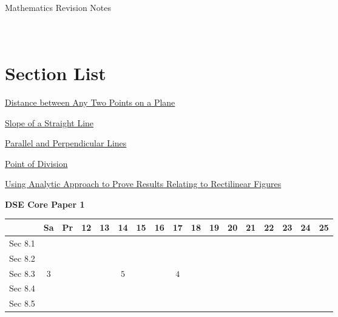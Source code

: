 \documentclass[12pt, a4paper]{article}
\begin{document}
\newpage
\newpage
\thispagestyle{empty}
\begin{center}
Mathematics Revision Notes\\\vspace{1cm}
\\\vspace{1cm}
{\fontsize{24pt}{24pt}\selectfont {Coordinate Geometry of Straight Lines}} \\\vspace{1cm}
\label{chapter:S3-8}

\end{center}
\vspace{0.5cm}
\hline
\section*{Section List}
\begin{enumx}[label=Sec 8.\arabic*\ ]
\item \hyperref[section:3-8-1]{Distance between Any Two Points on a Plane}
\item \hyperref[section:3-8-2]{Slope of a Straight Line}
\item \hyperref[section:3-8-3]{Parallel and Perpendicular Lines}
\item \hyperref[section:3-8-4]{Point of Division}
\item \hyperref[section:3-8-5]{Using Analytic Approach to Prove Results Relating to Rectilinear Figures \NF}
\end{enumx}
\begin{absolutelynopagebreak}
\begin{center}
\textbf{DSE Core Paper 1}
\end{center}
\begin{center}
\begin{tabular}{|l|c|c|c|c|c|c|c|c|c|c|c|c|c|c|c|c|}
\hline
        & Sa & Pr & 12 & 13 & 14 & 15 & 16 & 17 & 18 & 19 & 20 & 21 & 22 & 23 & 24 & 25 \\\hline\hline
Sec 8.1 &  &  &  &  &  &  &  &  &  &  &  &  &  &  &  &  \\\hline
Sec 8.2 &  &  &  &  &  &  &  &  &  &  &  &  &  &  &  &  \\\hline
Sec 8.3 &  $3$ &  &  &  &  $5$ &  &  &  $4$ &  &  &  &  &  &  &  &  \\\hline
Sec 8.4 &  &  &  &  &  &  &  &  &  &  &  &  &  &  &  &  \\\hline
Sec 8.5 &  &  &  &  &  &  &  &  &  &  &  &  &  &  &  &  \\\hline
\end{tabular}
\end{center}
\end{absolutelynopagebreak}
\end{document}
